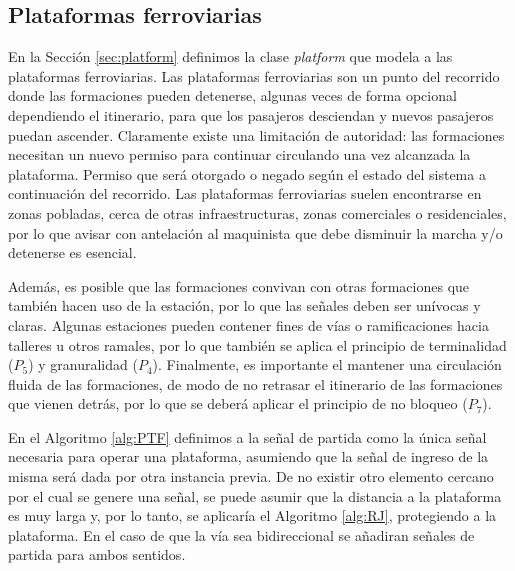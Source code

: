 \subsection{Plataformas ferroviarias}

	\label{sec:sig_platform}
	

    En la Sección \ref{sec:platform} definimos la clase \textit{platform} que modela a las plataformas ferroviarias. Las plataformas ferroviarias son un punto del recorrido donde las formaciones pueden detenerse, algunas veces de forma opcional dependiendo el itinerario, para que los pasajeros desciendan y nuevos pasajeros puedan ascender. Claramente existe una limitación de autoridad: las formaciones necesitan un nuevo permiso para continuar circulando una vez alcanzada la plataforma. Permiso que será otorgado o negado según el estado del sistema a continuación del recorrido. Las plataformas ferroviarias suelen encontrarse en zonas pobladas, cerca de otras infraestructuras, zonas comerciales o residenciales, por lo que avisar con antelación al maquinista que debe disminuir la marcha y/o detenerse es esencial.

    Además, es posible que las formaciones convivan con otras formaciones que también hacen uso de la estación, por lo que las señales deben ser unívocas y claras. Algunas estaciones pueden contener fines de vías o ramificaciones hacia talleres u otros ramales, por lo que también se aplica el principio de terminalidad ($P_5$) y granuralidad ($P_4$). Finalmente, es importante el mantener una circulación fluida de las formaciones, de modo de no retrasar el itinerario de las formaciones que vienen detrás, por lo que se deberá aplicar el principio de no bloqueo ($P_7$).

    En el Algoritmo \ref{alg:PTF} definimos a la señal de partida como la única señal necesaria para operar una plataforma, asumiendo que la señal de ingreso de la misma será dada por otra instancia previa. De no existir otro elemento cercano por el cual se genere una señal, se puede asumir que la distancia a la plataforma es muy larga y, por lo tanto, se aplicaría el Algoritmo \ref{alg:RJ}, protegiendo a la plataforma. En el caso de que la vía sea bidireccional se añadiran señales de partida para ambos sentidos.

